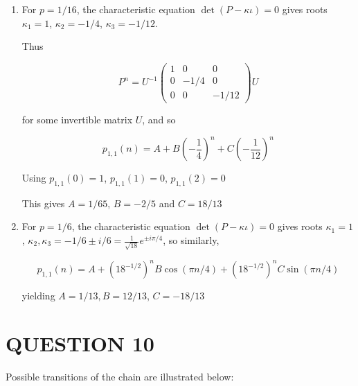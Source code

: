 \documentclass[a4paper]{article}
\begin{document}
\begin{enumerate}[label = (\alph*)]
	\item For $ p = 1/16 $, the characteristic equation $ \det(P - \kappa \iota) = 0 $  gives roots $ \kappa_{1} = 1 $, $ \kappa_{2} = - 1/4 $, $ \kappa_{3} = - 1/12 $.
	
	Thus
	
	\[ P^{n} = U^{-1}  \begin{pmatrix}
	1 & 0 & 0 \\
	0 & -1/4 & 0 \\
	0 & 0 & - 1/12 
	\end{pmatrix} U  \]
	
	for some invertible matrix $ U $, and so
	
	\[ p_{1,1}(n) = A + B\left(  - \frac{1}{4} \right)^{n} + C \left(  - \frac{1}{12} \right)^{n}  \]
	
	Using $ p_{1,1}(0) = 1 $, $ p_{1,1}(1) = 0 $, $ p_{1,1}(2) = 0 $
	
	This gives $ A = 1/65 $, $ B = - 2/5 $ and $ C = 18/13 $
	
	\item For $ p = 1/6 $, the characteristic equation $ \det(P - \kappa \iota) = 0 $  gives roots $ \kappa_{1} = 1 $, $ \kappa_{2}, \kappa_{3} = -1/6 \pm i/6 = \frac{1}{\sqrt{18}} e^{\pm i \pi / 4} $, so similarly,
	
	\[ p_{1,1}(n) = A + \left(  18^{-1/2} \right)^{n} B \cos ( \pi n / 4) + \left(  18^{-1/2} \right)^{n} C \sin ( \pi n / 4)    \]
	
	yielding $ A = 1/13,  B = 12/13 $, $ C = - 18/13 $
 	
	
\end{enumerate}




\section{QUESTION 10}

Possible transitions of the chain are illustrated below:
  \begin{center}
\end{center}
\end{document}
